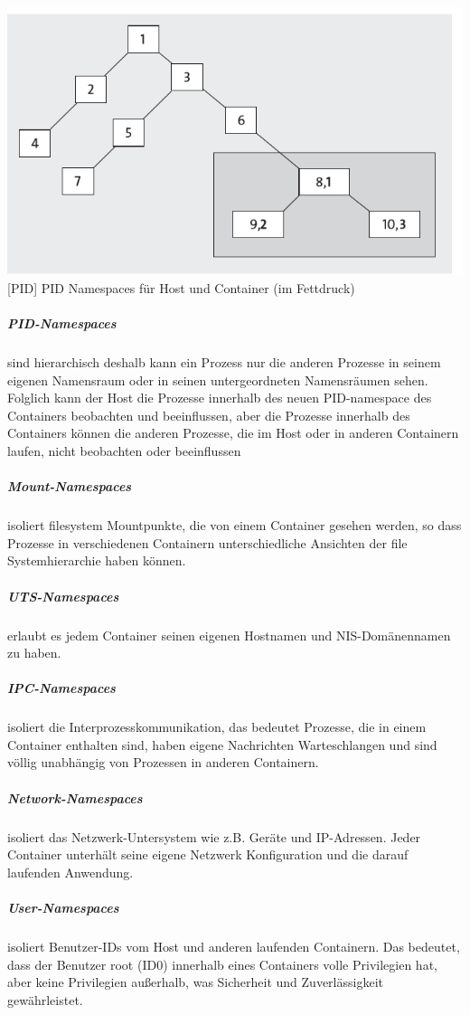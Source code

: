 \vspace{1em}
\begin{minipage}{\linewidth}
	\centering
	\includegraphics[width=1\linewidth]{pics/PID.PNG}
	[PID]{ PID Namespaces für Host und Container (im Fettdruck) \cite{Liebel2017SkalierbareContainer-Infrastrukturen}}
	\label{fig:PID}
\end{minipage}

\subparagraph{PID-Namespaces} sind hierarchisch deshalb kann ein Prozess nur die anderen Prozesse in seinem eigenen Namensraum oder in seinen untergeordneten Namensräumen sehen. Folglich kann der Host die Prozesse innerhalb des neuen PID-namespace des Containers beobachten und beeinflussen, aber die Prozesse innerhalb des Containers können die anderen Prozesse, die im Host oder in anderen Containern laufen, nicht beobachten oder beeinflussen

\subparagraph{Mount-Namespaces} isoliert filesystem Mountpunkte, die von einem Container gesehen werden, so dass Prozesse in verschiedenen Containern unterschiedliche Ansichten der file Systemhierarchie haben können.

\subparagraph{UTS-Namespaces} erlaubt es jedem Container seinen eigenen Hostnamen und NIS-Domänennamen zu haben.

\subparagraph{IPC-Namespaces} isoliert die Interprozesskommunikation, das bedeutet Prozesse, die in einem Container enthalten sind, haben eigene Nachrichten Warteschlangen und sind völlig unabhängig von Prozessen in anderen Containern.

\subparagraph{Network-Namespaces} isoliert das Netzwerk-Untersystem wie z.B. Geräte und IP-Adressen. Jeder Container unterhält seine eigene Netzwerk Konfiguration und die darauf laufenden Anwendung.

\subparagraph{User-Namespaces} isoliert Benutzer-IDs vom Host und anderen laufenden Containern. Das bedeutet, dass der Benutzer root (ID0) innerhalb eines Containers volle Privilegien hat, aber keine Privilegien außerhalb, was Sicherheit und Zuverlässigkeit gewährleistet. \cite{Xavier2015AClouds}

